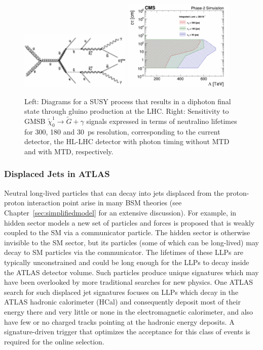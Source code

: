 \begin{figure}[t]\begin{center}
\includegraphics[width=0.47\textwidth]{figures/MTD/diagram.pdf}
\includegraphics[width=0.47\textwidth]{figures/MTD/Limits_excl_2D_ComparingRes.pdf}
\caption{
Left: Diagrams for a SUSY process that results in a diphoton final state through gluino production at the LHC. Right: Sensitivity to GMSB $\tilde{\chi}_0^1 \to \tilde{G} + \gamma$ signals expressed in terms of neutralino lifetimes for 300, 180 and 30~ps resolution, corresponding to the current detector, the HL-LHC detector with photon timing without MTD and with MTD, respectively.
}
\label{fig:cmsupgrade_photon}
\end{center}
\end{figure}

\subsubsection{Displaced Jets in ATLAS}


Neutral long-lived particles that can decay into jets displaced from the proton-proton interaction point arise in many BSM theories (see Chapter~\ref{sec:simplifiedmodel} for an extensive discussion). For example, in hidden sector models a new set of particles and forces is proposed that is weakly coupled to the SM via a communicator particle. The hidden sector is otherwise invisible to the SM sector, but its particles (some of which can be long-lived) may decay to SM particles via the communicator. The lifetimes of these LLPs are typically unconstrained and could be long enough for the LLPs to decay inside the ATLAS detector volume. Such particles produce unique signatures which may have been overlooked by more traditional searches for new physics. One ATLAS search for such displaced jet signatures focuses on LLPs which decay in the ATLAS hadronic calorimeter (HCal) and consequently deposit most of their energy there and very little or none in the electromagnetic calorimeter, and also have few or no charged tracks pointing at the hadronic energy deposits. A signature-driven trigger that optimizes the acceptance for this class of events is required for the online selection.


